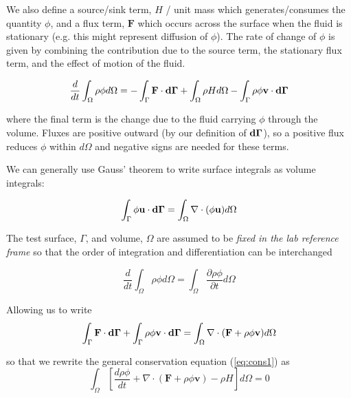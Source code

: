 \documentclass[10pt]{article}
\begin{document}
We also define a source/sink term, $H$ / unit mass which generates/consumes
the quantity $\phi$, and a flux term, $\mathbf{F}$ which occurs across the
surface when the fluid is stationary (e.g. this might represent diffusion of
$\phi$). The rate of change of $\phi$ is given by combining the contribution
due to the source term, the stationary flux term, and the effect of motion of
the fluid.		

	\begin{equation}
		\frac{d}{dt} \int_{\Omega} \rho \phi d\Omega =
			- \int_{\Gamma} \mathbf{F} \cdot \mathbf{d}\boldsymbol{\Gamma} 
			+ \int_{\Omega} \rho H d\Omega
			- \int _{\Gamma} \rho \phi \mathbf{v} \cdot \mathbf{d}\boldsymbol{\Gamma} 
		\label{eq:cons1}	
	\end{equation}
		
where the final term is the change due to the fluid carrying $\phi$ through
the volume. Fluxes are positive outward (by our definition of $\mathbf{d}\boldsymbol{\Gamma}$), so a
positive flux reduces $\phi$ within $d\Omega$ and negative signs are needed
for these terms.
	
	We can generally use Gauss' theorem to write surface integrals as volume integrals:
	
		\begin{equation}
				\int_{\Gamma} \phi \mathbf{u} \cdot \mathbf{d}\boldsymbol{\Gamma} = \int_{\Omega}  \nabla \cdot (\phi \mathbf{u}) d\Omega
		\end{equation}
	
The test surface, $\Gamma$, and volume, $\Omega$ are assumed to be \emph{fixed
in the lab reference frame} so that the order of integration and
differentiation can be interchanged

\begin{equation}
			\frac{d}{dt} \int_\Omega \rho \phi d\Omega =
			 	\int_\Omega \frac{\partial \rho \phi}{\partial t} d\Omega
\end{equation}
	
Allowing us to write
	\begin{equation}
		\int_{\Gamma} \mathbf{F} \cdot \mathbf{d}\boldsymbol{\Gamma} + 
		\int _{\Gamma} \rho \phi \mathbf{v} \cdot \mathbf{d}\boldsymbol{\Gamma} =
		\int_{\Omega} \nabla \cdot (\mathbf{F} + 
		\rho \phi \mathbf{v}) d\Omega	
	\end{equation}
		
so that we rewrite the general conservation equation (\ref{eq:cons1}) as 	
	\begin{equation}
		\int_{\Omega} \left[ \frac{d \rho \phi}{dt} + 
			\nabla \cdot (\mathbf{F} + \rho \phi \mathbf{v}) 
			-\rho H \right]	d\Omega	=0
	\end{equation}
		
\end{document}
